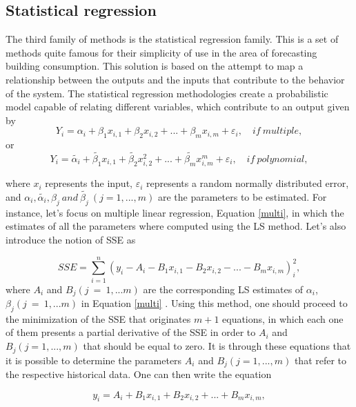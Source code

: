 \subsection{Statistical regression}

The third family of methods is the statistical regression family. This is a set of methods quite famous for their simplicity of use in the area of forecasting building consumption. This solution is based on the attempt to map a relationship between the outputs and the inputs that contribute to the behavior of the system. The statistical regression methodologies create a probabilistic model capable of relating different variables, which contribute to an output given by 
\begin{equation}
       Y_i = \alpha_i + \beta_1 x_{i,1} + \beta_2 x_{i,2} + ... + \beta_m x_{i,m} + \varepsilon_i,\quad if \  multiple,
\label{multi}
\end{equation}
or
\begin{equation}
       Y_i = \tilde{\alpha_i} + \tilde{\beta_1} x_{i,1} + \tilde{\beta_2} x_{i,2}^2 + ... + \tilde{\beta_m} x_{i,m}^m + \varepsilon_i,\quad if \  polynomial,
\label{poly}
\end{equation}

where $x_i$ represents the input, $\varepsilon_i$ represents a random normally distributed error, and  $\alpha_i, \tilde{\alpha_i}, \beta_j\  and\  \tilde{\beta_j}\ (j=1,...,m)$ are the parameters to be estimated. For instance, let's focus on multiple linear regression, Equation \ref{multi}, in which the estimates of all the parameters where computed using the \ac{LS} method. Let's also introduce the notion of \ac{SSE} as

\begin{equation}
       SSE = \sum_{i=1}^n (y_i-A_i-B_1 x_{i,1} - B_2 x_{i,2} - ... - B_m x_{i,m})_i^2,
\label{SSE}
\end{equation}
 where $A_i$ and $B_j(j\ =\ 1,...m)$ are the corresponding \ac{LS} estimates of $\alpha_i$, $\beta_j(j\ =\ 1,...m)$ in Equation \ref{multi} \cite{review2017}. Using this method, one should proceed to the minimization of the SSE that originates $m+1$ equations, in which each one of them presents a partial derivative of the \ac{SSE} in order to $A_i$ and $B_j(j=1,...,m)$ that should be equal to zero. It is through these equations that it is possible to determine the parameters $A_i$ and $B_j(j=1,...,m)$ that refer to the respective historical data. One can then write the equation
 
\begin{equation}
       y_i = A_i + B_1 x_{i,1} +  B_2 x_{i,2} + ... + B_m x_{i,m},
\label{y_i}
\end{equation}

